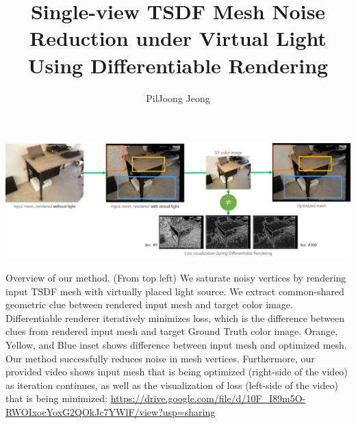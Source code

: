 \documentclass[acmtog,review]{acmart}
\begin{document}
\title{Single-view TSDF Mesh Noise Reduction under Virtual Light Using Differentiable Rendering}

\author{PilJoong Jeong}


\begin{teaserfigure}
    \includegraphics[width=\textwidth]{figures/1_overview_rev3.png}
    \caption{Overview of our method. (From top left) We saturate noisy vertices by rendering input TSDF mesh with virtually placed light source. We extract common-shared geometric clue between rendered input mesh and target color image. Differentiable renderer iteratively minimizes loss, which is the difference between clues from rendered input mesh and target Ground Truth color image. Orange, Yellow, and Blue inset shows difference between input mesh and optimized mesh. Our method successfully reduces noise in mesh vertices. Furthermore, our provided video shows input mesh that is being optimized (right-side of the video) as iteration continues, as well as the visualization of loss (left-side of the video) that is being minimized: \url{https://drive.google.com/file/d/10F_I89m5O-RWOIxocYoxG2QOkJc7YWlF/view?usp=sharing}}
    \label{fig:one}
\end{teaserfigure}
\end{document}

